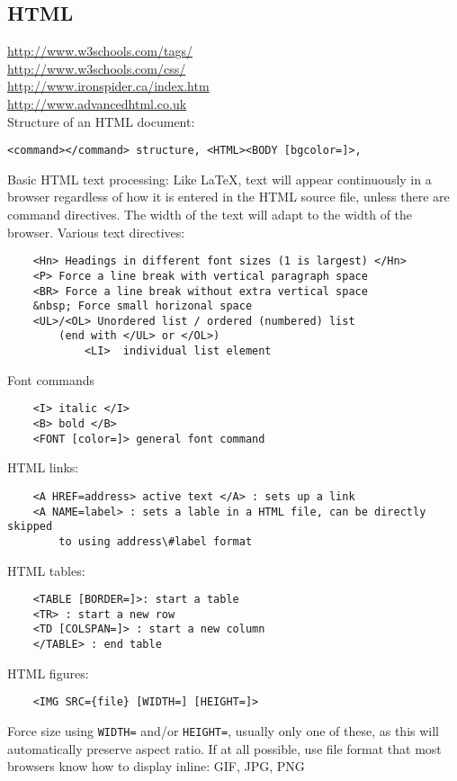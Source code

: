 \documentclass[12pt]{article}
\begin{document}
\subsection{HTML}

\url{http://www.w3schools.com/tags/}\\
\url{http://www.w3schools.com/css/}\\
\url{http://www.ironspider.ca/index.htm}\\
\url{http://www.advancedhtml.co.uk}\\

Structure of an HTML document:
\begin{verbatim}
<command></command> structure, <HTML><BODY [bgcolor=]>,
\end{verbatim}

Basic HTML text processing: Like LaTeX, text will appear continuously in a browser
regardless of how it is entered in the HTML source file, unless there
are command directives. The width of the text will adapt to the width
of the browser. Various text directives:
\begin{verbatim}
    <Hn> Headings in different font sizes (1 is largest) </Hn>
    <P> Force a line break with vertical paragraph space
    <BR> Force a line break without extra vertical space
    &nbsp; Force small horizonal space
    <UL>/<OL> Unordered list / ordered (numbered) list
        (end with </UL> or </OL>)
            <LI>  individual list element
\end{verbatim}
Font commands
\begin{verbatim}
    <I> italic </I>
    <B> bold </B>
    <FONT [color=]> general font command
\end{verbatim}

HTML links:
\begin{verbatim}
    <A HREF=address> active text </A> : sets up a link
    <A NAME=label> : sets a lable in a HTML file, can be directly skipped
        to using address\#label format
\end{verbatim}

HTML tables:
\begin{verbatim}
    <TABLE [BORDER=]>: start a table
    <TR> : start a new row
    <TD [COLSPAN=]> : start a new column
    </TABLE> : end table
\end{verbatim}

HTML figures:
\begin{verbatim}
    <IMG SRC={file} [WIDTH=] [HEIGHT=]>
\end{verbatim}
Force size using \verb|WIDTH=| and/or \verb|HEIGHT=|, usually only one of these,
as this will automatically preserve aspect ratio.
If at all possible, use file format that most browsers know how to
display inline: GIF, JPG, PNG
\end{document}
